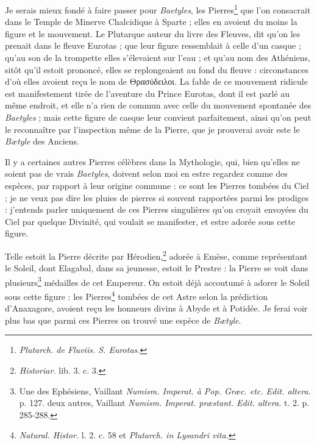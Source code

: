 \documentclass[a4paper, 11pt, oneside, polutonikogreek, french]{article}
\begin{document}
Je serais mieux fondé à faire passer pour \emph{Baetyles}, les Pierres\footnote{\emph{Plutarch. de Fluviis. S. Eurotas.}} que l'on consacrait dans le Temple de Minerve Chalcidique à Sparte ; elles en avoient du moins la figure et le mouvement. Le Plutarque auteur du livre des Fleuves, dit qu'on les prenait dans le fleuve Eurotas ; que leur figure ressemblait à celle d'un casque ; qu'au son de la trompette elles s'élevaient sur l'eau ; et qu'au nom des Athéniens, sitôt qu'il estoit prononcé, elles se replongeaient au fond du fleuve : circonstances d'où elles avoient reçu le nom de Θρασύδειλοι. La fable de ce mouvement ridicule est manifestement tirée de l'aventure du Prince Eurotas, dont il est parlé au même endroit, et elle n'a rien de commun avec celle du mouvement spontanée des \emph{Baetyles} ; mais cette figure de casque leur convient parfaitement, ainsi qu'on peut le reconnaître par l'inspection même de la Pierre, que je prouverai avoir este le \emph{Bætyle} des Anciens.

Il y a certaines autres Pierres célèbres dans la Mythologie, qui, bien qu'elles ne soient pas de vrais \emph{Baetyles}, doivent selon moi en estre regardez comme des espèces, par rapport à leur origine commune : ce sont les Pierres tombées du Ciel ; je ne veux pas dire les pluies de pierres si souvent rapportées parmi les prodiges : j'entends parler uniquement de ces Pierres singulières qu'on croyait envoyées du Ciel par quelque Divinité, qui voulait se manifester, et estre adorée sous cette figure.

Telle estoit la Pierre décrite par Hérodien,\footnote{\emph{Historiar.} lib. 3. c. 3.} adorée à Emèse, comme représentant le Soleil, dont Elagabal, dans sa jeunesse, estoit le Prestre : la Pierre se voit dans plusieurs\footnote{Une des Ephésiens, Vaillant \emph{Numism. Imperat. à Pop. Græc. etc. Edit. altera.} p. 127. deux autres, Vaillant \emph{Numism. Imperat. præstant. Edit. altera.} t. 2. p. 285-288.} médailles de cet Empereur. On estoit déjà accoutumé à adorer le Soleil sous cette figure : les Pierres\footnote{\emph{Natural. Histor.} l. 2. c. 58 et \emph{Plutarch. in Lysandri vita.}} tombées de cet Astre selon la prédiction d'Anaxagore, avoient reçu les honneurs divins à Abyde et à Potidée. Je ferai voir plus bas que parmi ces Pierres on trouvé une espèce de \emph{Bætyle}.
\end{document}
